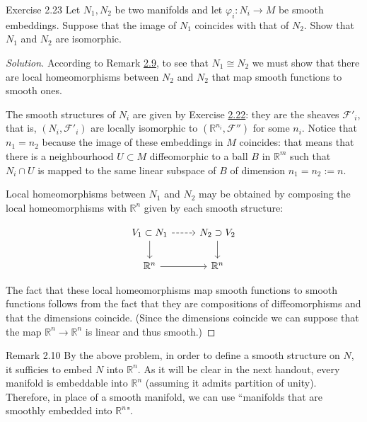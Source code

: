 \begin{thing4}{Exercise 2.23}\label{exer:2.23}\leavevmode
Let \(N_1,N_2\) be two manifolds and let \(\varphi_i:N_i\to M\) be smooth embeddings. Suppose that the image of \(N_1\) coincides with that of \(N_2\). Show that \(N_1\) and \(N_2\) are isomorphic.
\end{thing4}

\begin{proof}[Solution]\leavevmode
According to Remark \hyperref[rk:2.9]{2.9}, to see that \(N_1\cong N_2\) we must show that there are local homeomorphisms between \(N_2\) and \(N_2\) that map smooth functions to smooth ones.

The smooth structures of \(N_i\) are given by Exercise \hyperref[exer:2.22]{2.22}: they are the sheaves \(\mathcal{F}'_i\), that is, \((N_i,\mathcal{F}'_i)\) are locally isomorphic to \((\mathbb{R}^{n_i},\mathcal{F}'')\) for some \(n_i\). Notice that \(n_1=n_2\) because the image of these embeddings in \(M\) coincides: that means that there is a neighbourhood \(U \subset M\) diffeomorphic to a ball \(B\) in \(\mathbb{R}^m\) such that \(N_i \cap U\) is mapped to the same linear subspace of \(B\) of dimension \(n_1=n_2:=n\).

Local homeomorphisms between \(N_1\) and \(N_2\) may be obtained by composing the local homeomorphisms with \(\mathbb{R}^{n}\) given by each smooth structure:

\[\begin{tikzcd}
	V_1 \subset N_1\arrow[r,dashed]\arrow[d]&N_2\supset V_2\arrow[d]\\
	\mathbb{R}^n\arrow[r]&\mathbb{R}^n
\end{tikzcd}\]


The fact that these local homeomorphisms map smooth functions to smooth functions follows from the fact that they are compositions of diffeomorphisms and that the dimensions coincide. (Since the dimensions coincide we can suppose that the map \(\mathbb{R}^{n}\to \mathbb{R}^{n}\) is linear and thus smooth.)
\end{proof}

\begin{thing5}{Remark 2.10}\leavevmode
By the above problem, in order to define a smooth structure on $N$, it sufficies to embed $N$ into \(\mathbb{R}^n\). As it will be clear in the next handout, every manifold is embeddable into \(\mathbb{R}^n\) (assuming it admits partition of unity). Therefore, in place of a smooth manifold, we can use ``manifolds that are smoothly embedded into \(\mathbb{R}^n\)".
\end{thing5}

